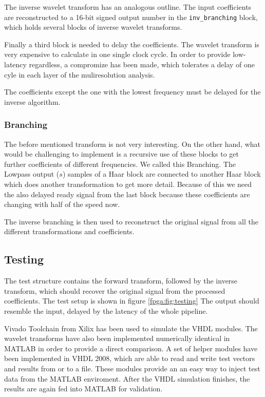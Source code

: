 \begin{refsection}
The inverse wavelet transform has an analogous outline.
The input coefficients are reconstructed to a 16-bit signed output number in the \texttt{inv\_branching} block, which holds several blocks of inverse wavelet transforms.

Finally a third block is needed to delay the coefficients.
The wavelet transform is very expensive to calculate in one single clock cycle.
In order to provide low-latency regardless, a compromize has been made, which tolerates a delay of one cyle in each layer of the muliresolution analysis.

The coefficients except the one with the lowest frequency must be delayed for the inverse algorithm.


\subsubsection{Branching}

The before mentioned transform is not very interesting. On the other hand, what would be challenging to implement is a recursive use of these blocks to get further coefficients of different frequencies.
We called this Branching. The Lowpass output ($s$) samples of a Haar block are connected to another Haar block which does another transformation to get more detail. Because of this we need the also delayed ready signal from the last block because these coefficients are changing with half of the speed now. 

The inverse branching  is then used to reconstruct the original signal from all the different transformations and coefficients.





\subsection{Testing}

The test structure contains the forward transform, followed by the inverse transform, which should recover the original signal from the processed coefficients.
The test setup is shown in figure \ref{fpga:fig:testing}
The output should resemble the input, delayed by the latency of the whole pipeline.

Vivado Toolchain from Xilix has been used to simulate the VHDL modules.
The wavelet transforms have also been implemented numerically identical in MATLAB in order to provide a direct comparison. 
A set of helper modules have been implemented in VHDL 2008, which are able to read and write test vectors and results from or to a file.
These modules provide an an easy way to inject test data from the MATLAB enviroment.
After the VHDL simulation finishes, the results are again fed into MATLAB for validation.





\end{refsection}
